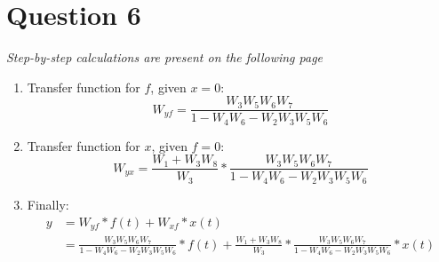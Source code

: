 \documentclass[12pt,letterpaper]{article}
\begin{document}
\section*{Question 6}
\label{Q:6}
\textit{Step-by-step calculations are present on the following page}
\begin{enumerate}[leftmargin=!,labelindent=5pt]
    \item Transfer function for $f$, given $x = 0$:
    \begin{equation*}
        W_{yf} = \frac{W_3 W_5 W_6 W_7}{1 - W_4 W_6 - W_2 W_3 W_5 W_6}
    \end{equation*}
    
    \item Transfer function for $x$, given $f = 0$:
    \begin{equation*}
        W_{yx} = \frac{W_1 + W_3 W_8}{W_3} * \frac{W_3 W_5 W_6 W_7}{1 - W_4 W_6 - W_2 W_3 W_5 W_6}
    \end{equation*}
    
    \item Finally:
    \begin{align*}
        y &=  W_{yf} * f(t) +  W_{xf} * x(t) \\
        &= \frac{W_3 W_5 W_6 W_7}{1 - W_4 W_6 - W_2 W_3 W_5 W_6} * f(t) + \frac{W_1 + W_3 W_8}{W_3} * \frac{W_3 W_5 W_6 W_7}{1 - W_4 W_6 - W_2 W_3 W_5 W_6} * x(t)
    \end{align*}
    
    
\end{enumerate}
\end{document}
